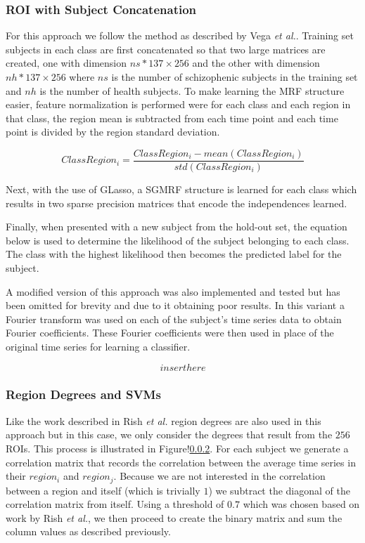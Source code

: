\documentclass{article} %
\begin{document}
\subsubsection{ROI with Subject Concatenation}
For this approach we follow the method as described by Vega \emph{et al.}.
Training set subjects in each class are first concatenated so that two large 
matrices are created, one with dimension $ns * 137 \times 256$ and the other 
with dimension $nh * 137 \times 256$ where $ns$ is the number of schizophenic 
subjects in the training set and $nh$ is the number of health subjects. To
make learning the MRF structure easier, feature normalization is performed
were for each class and each region in that class, the region mean is 
subtracted from each time point and each time point is divided by the 
region standard deviation.

\begin{equation}
ClassRegion_i = \frac{ClassRegion_i - mean(ClassRegion_i)}{std(ClassRegion_i)}
\end{equation}

Next, with the use of GLasso, a SGMRF structure is learned for each class 
which results in two sparse precision matrices that encode the independences
learned. 

Finally, when presented with a new subject from the hold-out set, the equation
below is used to determine the likelihood of the subject belonging to each
class. The class with the highest likelihood then becomes the predicted label
for the subject.

A modified version of this approach was also implemented and tested but has
been omitted for brevity and due to it obtaining poor results. In this variant
a Fourier transform was used on each of the subject's time series data to 
obtain Fourier coefficients. These Fourier coefficients were then used in 
place of the original time series for learning a classifier.

\begin{equation}
insert here
\end{equation}


\subsubsection{Region Degrees and SVMs}
Like the work described in Rish \emph{et al.} region degrees are also used in
this approach but in this case, we only consider the degrees that result from
the $256$ ROIs. This process is illustrated in Figure!\ref{}. For each subject 
we generate a correlation matrix that records the correlation between the 
average time series in their $region_i$ and $region_j$. Because we are not 
interested in the correlation between a region and itself (which is trivially 
$1$) we subtract the diagonal of the correlation matrix from itself. Using a
threshold of $0.7$ which was chosen based on work by Rish \emph{et al.}, we
then proceed to create the binary matrix and sum the column values as 
described previously.
\end{document}
